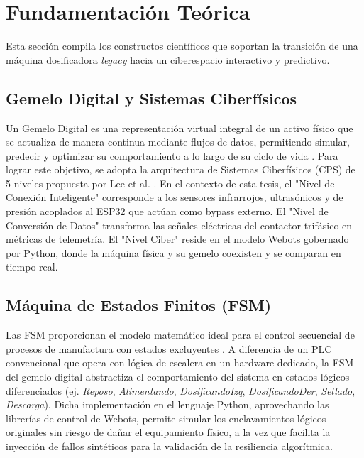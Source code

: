 \section{Fundamentación Teórica}

Esta sección compila los constructos científicos que soportan la transición de una máquina dosificadora \textit{legacy} hacia un ciberespacio interactivo y predictivo.

\subsection*{Gemelo Digital y Sistemas Ciberfísicos}
Un Gemelo Digital es una representación virtual integral de un activo físico que se actualiza de manera continua mediante flujos de datos, permitiendo simular, predecir y optimizar su comportamiento a lo largo de su ciclo de vida \cite{tao2019}. Para lograr este objetivo, se adopta la arquitectura de Sistemas Ciberfísicos (CPS) de 5 niveles propuesta por Lee et al. \cite{lee2015}. En el contexto de esta tesis, el "Nivel de Conexión Inteligente" corresponde a los sensores infrarrojos, ultrasónicos y de presión acoplados al ESP32 que actúan como bypass externo. El "Nivel de Conversión de Datos" transforma las señales eléctricas del contactor trifásico en métricas de telemetría. El "Nivel Ciber" reside en el modelo Webots gobernado por Python, donde la máquina física y su gemelo coexisten y se comparan en tiempo real.

\subsection*{Máquina de Estados Finitos (FSM)}
Las FSM proporcionan el modelo matemático ideal para el control secuencial de procesos de manufactura con estados excluyentes \cite{cassandras2021}. A diferencia de un PLC convencional que opera con lógica de escalera en un hardware dedicado, la FSM del gemelo digital abstractiza el comportamiento del sistema en estados lógicos diferenciados (ej. \textit{Reposo}, \textit{Alimentando}, \textit{DosificandoIzq}, \textit{DosificandoDer}, \textit{Sellado}, \textit{Descarga}). Dicha implementación en el lenguaje Python, aprovechando las librerías de control de Webots, permite simular los enclavamientos lógicos originales sin riesgo de dañar el equipamiento físico, a la vez que facilita la inyección de fallos sintéticos para la validación de la resiliencia algorítmica.

